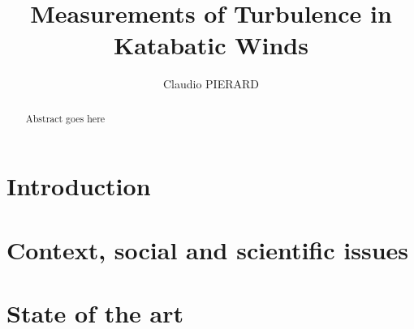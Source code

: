 \documentclass[a4paper,12pt]{article}
\title{Measurements of Turbulence in Katabatic Winds }
\author{Claudio PIERARD}
\begin{document}
\renewcommand{\labelitemi}{$\bullet$}

\maketitle
\begin{abstract}
    Abstract goes here
\end{abstract}

\newpage

\tableofcontents

\newpage

\section{Introduction}

\section{Context, social and scientific issues}

\section{State of the art}



\end{document}

